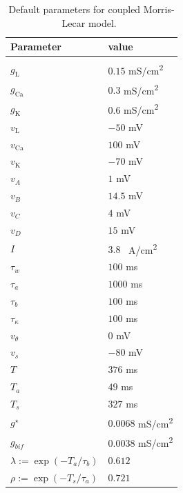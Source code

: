 \documentclass[utf8]{frontiers_suppmat} %
\renewcommand{\k}{\mathrm{K}}
\newcommand{\ca}{\mathrm{Ca}}
\newcommand{\leak}{\mathrm{L}}
\begin{document}
\begin{table}[h]
	\caption{Default parameters for coupled Morris-Lecar model.~\label{tab:pars}}
	\centering
	\begin{tabular}{ll}
		Parameter                        & value                 \\
		\hline
		                                 &                       \\
		$g_{\leak}$                      & $0.15$ \si{mS/cm^2}   \\
		$g_{\ca}$                        & $0.3$ \si{mS/cm^2}    \\
		$g_{\k}$                         & $0.6$ \si{mS/cm^2}    \\
		$v_{\leak}$                      & $-50$ \si{mV}         \\
		$v_{\ca}$                        & $100$ \si{mV}         \\
		$v_{\k}$                         & $-70$ \si{mV}         \\
		$v_{A}$                          & $1$ \si{mV}           \\
		$v_{B}$                          & $14.5$ \si{mV}        \\
		$v_{C}$                          & $4$ \si{mV}           \\
		$v_{D}$                          & $15$ \si{mV}          \\
		$I$                              & $3.8$ \si{\mu A/cm^2} \\
		$\tau_w$                         & $100$ \si{ms}         \\
		$\tau_a$                         & $1000$ \si{ms}        \\
		$\tau_b$                         & $100$ \si{ms}         \\
		$\tau_\kappa$                    & $100$ \si{ms}         \\
		$v_{\theta}$                     & $0$ \si{mV}           \\
		$v_{s}$                          & $-80$ \si{mV}         \\
		$T$                              & $376$ \si{ms}         \\
		$T_{a}$                        & $49$ \si{ms}          \\
		$T_{s}$                      & $327$ \si{ms}         \\
		$g^{\star}$                      & $0.0068$ \si{mS/cm^2} \\
		$g_{bif}$                        & $0.0038$ \si{mS/cm^2} \\
		$\lambda:=\exp(-T_{a}/\tau_b)$ & $0.612$               \\
		$\rho:=\exp(-T_{s}/\tau_a)$  & $0.721$               \\
	\end{tabular}
\end{table}
\end{document}
